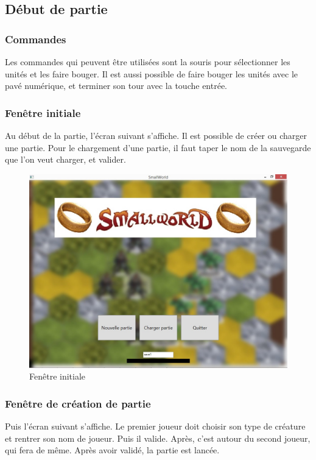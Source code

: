 \subsection{Début de partie}

\subsubsection{Commandes}
Les commandes qui peuvent être utilisées sont la souris pour sélectionner les unités et les faire bouger.
\newline
Il est aussi possible de faire bouger les unités avec le pavé numérique, et terminer son tour avec la touche entrée.

\subsubsection{Fenêtre initiale}
Au début de la partie, l'écran suivant s'affiche. Il est possible de créer ou charger une partie. Pour le chargement d'une partie, il faut taper le nom de la sauvegarde que l'on veut charger, et valider.

\begin{figure}[ht!]
\centering
\includegraphics[scale=0.65]{img/init.jpg}
\caption{Fenêtre initiale}
\end{figure}
\newpage

\subsubsection{Fenêtre de création de partie}
Puis l'écran suivant s'affiche. Le premier joueur doit choisir son type de créature et rentrer son nom de joueur. Puis il valide. Après, c'est autour du second joueur, qui fera de même. Après avoir validé, la partie est lancée.

